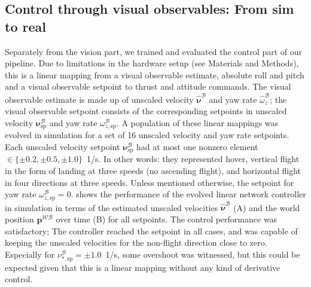 \subsection*{Control through visual observables: From sim to real}

Separately from the vision part, we trained and evaluated the control part of our pipeline. Due to limitations in the hardware setup (see Materials and Methods), this is a linear mapping from a visual observable estimate, absolute roll and pitch and a visual observable setpoint to thrust and attitude commands. The visual observable estimate is made up of unscaled velocity $\boldsymbol{\hat{\nu}}^\mathcal{B}$ and yaw rate $\hat{\omega}^\mathcal{B}_z$; the visual observable setpoint consists of the corresponding setpoints in unscaled velocity $\boldsymbol{\nu}^\mathcal{B}_{\mathrm{sp}}$ and yaw rate $\omega^\mathcal{B}_{z,\mathrm{sp}}$.
A population of these linear mappings was evolved in simulation for a set of 16 unscaled velocity and yaw rate setpoints. Each unscaled velocity setpoint $\boldsymbol{\nu}^\mathcal{B}_{\mathrm{sp}}$ had at most one nonzero element $\in \{\pm0.2,\pm0.5,\pm1.0\}$~1/s. In other words: they represented hover, vertical flight in the form of landing at three speeds (no ascending flight), and horizontal flight in four directions at three speeds. Unless mentioned otherwise, the setpoint for yaw rate $\omega^\mathcal{B}_{z,\mathrm{sp}} = 0$.  shows the performance of the evolved linear network controller in simulation in terms of the estimated unscaled velocities $\boldsymbol{\hat{\nu}}^\mathcal{B}$ (A) and the world position $\boldsymbol{p}^\mathcal{WB}$ over time (B) for all setpoints. The control performance was satisfactory; The controller reached the setpoint in all cases, and was capable of keeping the unscaled velocities for the non-flight direction close to zero. Especially for $\nu_{*,\mathrm{sp}}^\mathcal{B}=\pm1.0$~1/s, some overshoot was witnessed, but this could be expected given that this is a linear mapping without any kind of derivative control.

